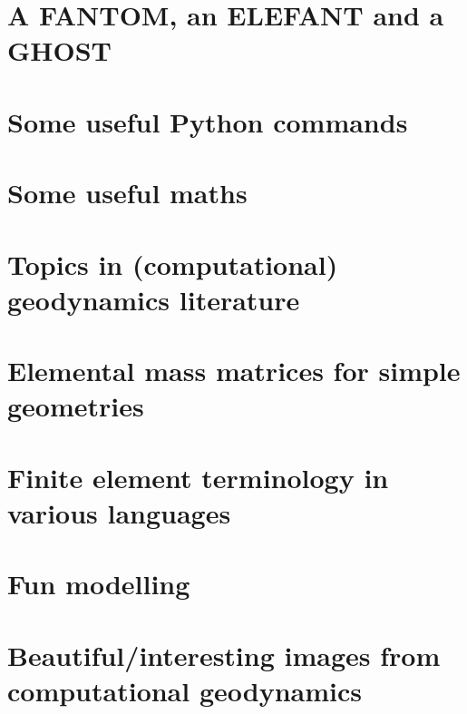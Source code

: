 \documentclass[a4paper]{article}
\begin{document}
\section{A FANTOM, an ELEFANT and a GHOST}  %
\newpage %
\section{Some useful Python commands}  %
\newpage %
\section{Some useful maths}  \label{app_maths} %
\newpage %
\section{Topics in (computational) geodynamics literature}\label{app:topics}
\newpage %
\section{Elemental mass matrices for simple geometries}\label{app:mm} 
\newpage %
\section{Finite element terminology in various languages}  %
\newpage %
\section{Fun modelling}  %
\newpage %
\section{Beautiful/interesting images from computational geodynamics}%
\newpage %
\end{document}
